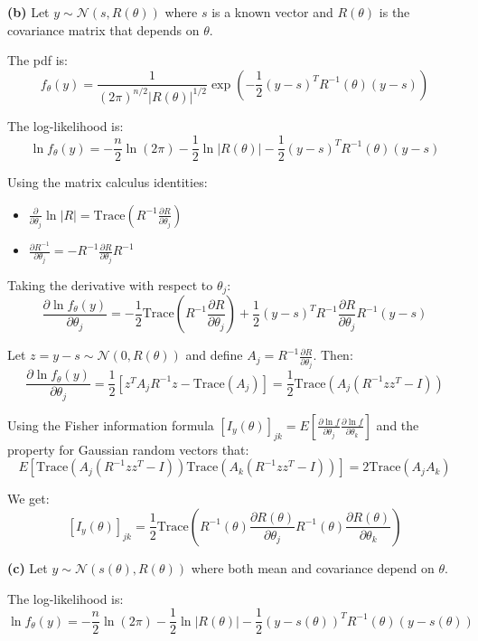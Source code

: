 \documentclass[12pt,a4paper,onecolumn]{exam}
\begin{document}
\begin{solution}
\textbf{(b)} Let $y \sim \mathcal{N}(s, R(\theta))$ where $s$ is a known vector and $R(\theta)$ is the covariance matrix that depends on $\theta$.

The pdf is:
\[
f_{\theta}(y) = \frac{1}{(2\pi)^{n/2}|R(\theta)|^{1/2}} \exp\left(-\frac{1}{2}(y-s)^T R^{-1}(\theta)(y-s)\right)
\]

The log-likelihood is:
\[
\ln f_{\theta}(y) = -\frac{n}{2}\ln(2\pi) - \frac{1}{2}\ln|R(\theta)| - \frac{1}{2}(y-s)^T R^{-1}(\theta)(y-s)
\]

Using the matrix calculus identities:
\begin{itemize}
    \item $\frac{\partial}{\partial \theta_j}\ln|R| = \text{Trace}\left(R^{-1}\frac{\partial R}{\partial \theta_j}\right)$
    \item $\frac{\partial R^{-1}}{\partial \theta_j} = -R^{-1}\frac{\partial R}{\partial \theta_j}R^{-1}$
\end{itemize}

Taking the derivative with respect to $\theta_j$:
\[
\frac{\partial \ln f_{\theta}(y)}{\partial \theta_j} = -\frac{1}{2}\text{Trace}\left(R^{-1}\frac{\partial R}{\partial \theta_j}\right) + \frac{1}{2}(y-s)^T R^{-1}\frac{\partial R}{\partial \theta_j}R^{-1}(y-s)
\]

Let $z = y - s \sim \mathcal{N}(0, R(\theta))$ and define $A_j = R^{-1}\frac{\partial R}{\partial \theta_j}$. Then:
\[
\frac{\partial \ln f_{\theta}(y)}{\partial \theta_j} = \frac{1}{2}\left[z^T A_j R^{-1} z - \text{Trace}(A_j)\right] = \frac{1}{2}\text{Trace}\left(A_j(R^{-1}zz^T - I)\right)
\]

Using the Fisher information formula $[I_y(\theta)]_{jk} = E\left[\frac{\partial \ln f}{\partial \theta_j}\frac{\partial \ln f}{\partial \theta_k}\right]$ and the property for Gaussian random vectors that:
\[
E[\text{Trace}(A_j(R^{-1}zz^T - I))\text{Trace}(A_k(R^{-1}zz^T - I))] = 2\text{Trace}(A_j A_k)
\]

We get:
\[
\boxed{[I_y(\theta)]_{jk} = \frac{1}{2}\text{Trace}\left(R^{-1}(\theta)\frac{\partial R(\theta)}{\partial \theta_j}R^{-1}(\theta)\frac{\partial R(\theta)}{\partial \theta_k}\right)}
\]

\vspace{1em}
\textbf{(c)} Let $y \sim \mathcal{N}(s(\theta), R(\theta))$ where both mean and covariance depend on $\theta$.

The log-likelihood is:
\[
\ln f_{\theta}(y) = -\frac{n}{2}\ln(2\pi) - \frac{1}{2}\ln|R(\theta)| - \frac{1}{2}(y-s(\theta))^T R^{-1}(\theta)(y-s(\theta))
\]


\end{solution}
\end{document}
